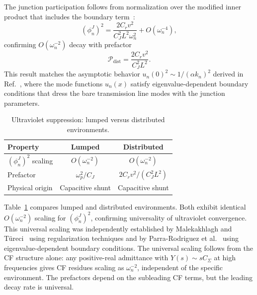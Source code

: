 \documentclass[reprint, floatfix, superscriptaddress, amsmath, amssymb, longbibliography]{revtex4-2}
\begin{document}
The junction participation follows from normalization over the modified inner product that includes the boundary term~\cite{ParraRodriguez2018}:
\begin{equation}
(\phi_n^J)^2 = \frac{2 C_r v^2}{C_J^2 L^2 \omega_n^2} + O(\omega_n^{-4}),
\label{eq:phi_J_squared_distributed}
\end{equation}
confirming $O(\omega_n^{-2})$ decay with prefactor
\begin{equation}
\mathcal{P}_{\mathrm{dist}} = \frac{2 C_r v^2}{C_J^2 L^2}.
\label{eq:prefactor_distributed}
\end{equation}
This result matches the asymptotic behavior $u_n(0)^2 \sim 1/(\alpha k_n)^2$ derived in Ref.~\cite{ParraRodriguez2018}, where the mode functions $u_n(x)$ satisfy eigenvalue-dependent boundary conditions that dress the bare transmission line modes with the junction parameters.


\begin{table}[t]
\caption{Ultraviolet suppression: lumped versus distributed environments.}
\label{tab:uv_comparison}
\begin{ruledtabular}
\begin{tabular}{lcc}
Property & Lumped & Distributed \\
\hline
$(\phi_n^J)^2$ scaling & $O(\omega_n^{-2})$ & $O(\omega_n^{-2})$ \\
Prefactor & $\omega_p^2/C_J$ & $2C_r v^2/(C_J^2 L^2)$ \\
Physical origin & Capacitive shunt & Capacitive shunt \\
\end{tabular}
\end{ruledtabular}
\end{table}
Table~\ref{tab:uv_comparison} compares lumped and distributed environments. Both exhibit identical $O(\omega_n^{-2})$ scaling for $(\phi_n^J)^2$, confirming universality of ultraviolet convergence. This universal scaling was independently established by Malekakhlagh and T\"ureci~\cite{Malekakhlagh2016, Malekakhlagh2017} using regularization techniques and by Parra-Rodriguez et al.~\cite{ParraRodriguez2018} using eigenvalue-dependent boundary conditions. The universal scaling follows from the CF structure alone: any positive-real admittance with $Y(s) \sim sC_\Sigma$ at high frequencies gives CF residues scaling as $\omega_n^{-2}$, independent of the specific environment. The prefactors depend on the subleading CF terms, but the leading decay rate is universal.

\end{document}
